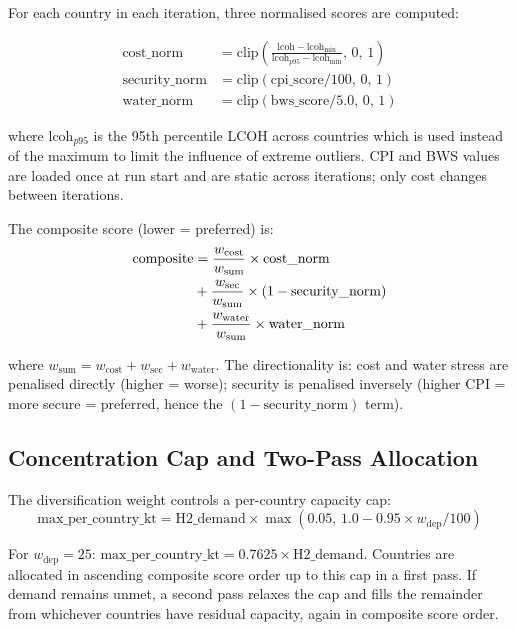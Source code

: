 For each country in each iteration, three normalised scores are computed:

\begin{align}
    \text{cost\_norm}     &= \text{clip}\!\left( \frac{\text{lcoh} - \text{lcoh}_{\min}}{\text{lcoh}_{p95} - \text{lcoh}_{\min}},\, 0,\, 1 \right) \\
    \text{security\_norm} &= \text{clip}(\text{cpi\_score} / 100,\, 0,\, 1) \\
    \text{water\_norm}    &= \text{clip}(\text{bws\_score} / 5.0,\, 0,\, 1)
\end{align}

where $\text{lcoh}_{p95}$ is the 95th percentile LCOH across countries which is used instead of the maximum to limit the influence of extreme outliers. CPI and BWS values are loaded once at run start and are static across iterations; only cost changes between iterations.

The composite score (lower = preferred) is:
\begin{align}
    \text{composite} &= \frac{w_{\text{cost}}}{w_{\text{sum}}} \times \text{cost\_norm} \notag \\
                     &+ \frac{w_{\text{sec}}}{w_{\text{sum}}} \times (1 - \text{security\_norm}) \notag \\
                     &+ \frac{w_{\text{water}}}{w_{\text{sum}}} \times \text{water\_norm}
\end{align}

where $w_{\text{sum}} = w_{\text{cost}} + w_{\text{sec}} + w_{\text{water}}$. The directionality is: cost and water stress are penalised directly (higher = worse); security is penalised inversely (higher CPI = more secure = preferred, hence the $(1 - \text{security\_norm})$ term).

\subsection{Concentration Cap and Two-Pass Allocation}

The diversification weight controls a per-country capacity cap:
\[ \text{max\_per\_country\_kt} = \text{H2\_demand} \times \max(0.05,\, 1.0 - 0.95 \times w_{\text{dep}}/100) \]

For $w_{\text{dep}} = 25$: $\text{max\_per\_country\_kt} = 0.7625 \times \text{H2\_demand}$. Countries are allocated in ascending composite score order up to this cap in a first pass. If demand remains unmet, a second pass relaxes the cap and fills the remainder from whichever countries have residual capacity, again in composite score order.

